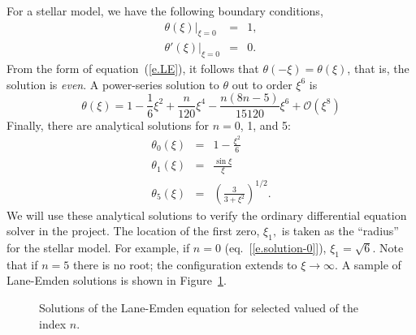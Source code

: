 For a stellar model, we have the following boundary conditions,
\begin{eqnarray}
\label{e.thetabc}\left.\theta(\xi)\right|_{\xi = 0} &=& 1,\\
\label{e.thetapbc}\left.\theta'(\xi)\right|_{\xi=0} &=& 0.
\end{eqnarray}
From the form of equation~(\ref{e.LE}), it follows that $\theta(-\xi) = \theta(\xi)$, that is, the solution is \emph{even}. A power-series solution to $\theta$ out to order $\xi^{6}$ is
\begin{equation}\label{e.series}
\theta(\xi) = 1 - \frac{1}{6}\xi^{2} + \frac{n}{120}\xi^{4} - \frac{n(8n-5)}{15120}\xi^{6} + \mathcal{O}(\xi^{8})
\end{equation}
Finally, there are analytical solutions for $n = 0$, 1, and 5:
\begin{eqnarray}
\theta_{0}(\xi) &=& 1-\frac{\xi^{2}}{6}\label{e.solution-0}\\
\theta_{1}(\xi) &=& \frac{\sin\xi}{\xi}\label{e.solution-1}\\
\theta_{5}(\xi) &=& \left(\frac{3}{3 + \xi^{2}}\right)^{1/2}.\label{e.solution-5}
\end{eqnarray}
We will use these analytical solutions to verify the ordinary differential equation solver in the project.  The location of the first zero, $\xi_{1},$ is taken as the ``radius'' for the stellar model.  For example, if $n = 0$ (eq.~[\ref{e.solution-0}]), $\xi_{1} = \sqrt{6}$. Note that if $n=5$ there is no root; the configuration extends to $\xi \to \infty$.  A sample of Lane-Emden solutions is shown in Figure~\ref{f.LE-solutions}.

\begin{figure}[htbp]
\caption{Solutions of the Lane-Emden equation for selected valued of the index $n$.}
\label{f.LE-solutions}
\end{figure}

